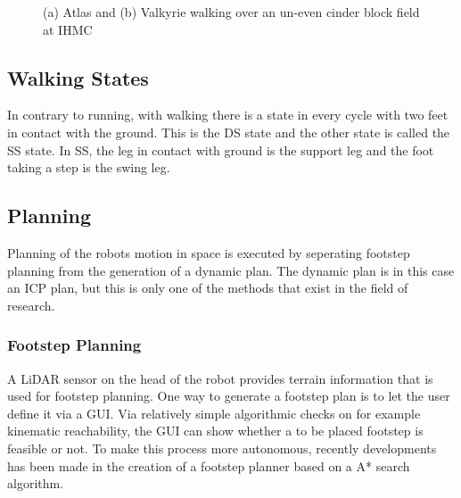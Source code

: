 \begin{figure}[h]
\begin{subfigure}{0.45\textwidth}
  \caption{}
   \label{fig:valkyrie}
  \end{subfigure}
  \caption{(a) Atlas and (b) Valkyrie walking over an un-even cinder block field at IHMC }
  \label{fig:robots}
\end{figure}
\subsection{Walking States}
In contrary to running, with walking there is a state in every cycle with two feet in contact with the ground. This is the \ac{DS} state and the other state is called the \ac{SS} state. In \ac{SS}, the leg in contact with ground is the support leg and the foot taking a step is the swing leg. 
\subsection{Planning}
Planning of the robots motion in space is executed by seperating footstep planning from the generation of a dynamic plan. The dynamic plan is in this case an \ac{ICP} plan, but this is only one of the methods that exist in the field of research.
\subsubsection{Footstep Planning}
A \ac{LiDAR} sensor on the head of the robot provides terrain information that is used for footstep planning. One way to generate a footstep plan is to let the user define it via a \ac{GUI}. Via relatively simple algorithmic checks on for example kinematic reachability, the \ac{GUI} can show whether a to be placed footstep is feasible or not. To make this process more autonomous, recently developments has been made in the creation of a footstep planner based on a A* search algorithm. 
